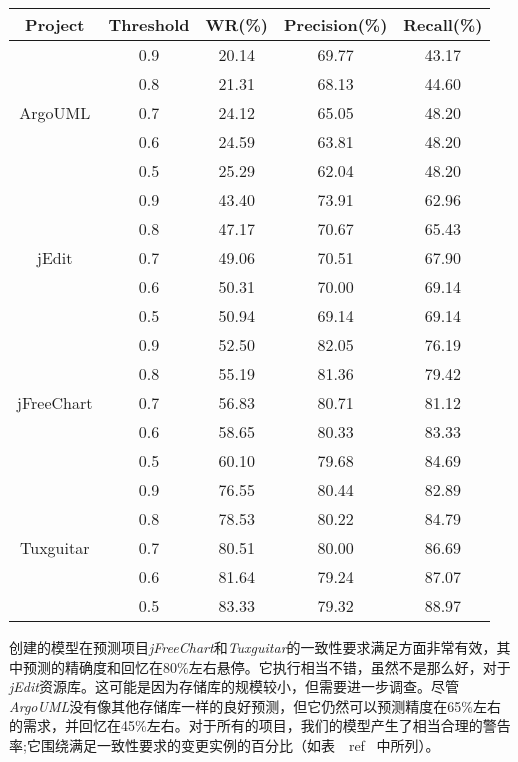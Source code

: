 \begin{table}[htbp]
\vspace{0.5em}\centering\wuhao
\begin{tabular}{ccccc}
\toprule[1.5pt]
\textbf{Project}&\textbf{Threshold}&\textbf{WR(\%)}&\textbf{Precision(\%)}&\textbf{Recall(\%)}\\

\midrule[1pt]
 \multirow{5}{*}{ArgoUML}
&0.9&	20.14&	69.77&	43.17\\
&0.8&	21.31&	68.13&	44.60\\
&0.7&	24.12&	65.05&	48.20\\
&0.6&	24.59&	63.81&	48.20\\
&0.5&	25.29&	62.04&	48.20\\
\hline
\multirow{5}{*}{jEdit}
&0.9&	43.40&	73.91&	62.96\\
&0.8&	47.17&	70.67&	65.43\\
&0.7&	49.06&	70.51&	67.90\\
&0.6&	50.31&	70.00&	69.14\\
&0.5&	50.94&	69.14&	69.14\\
\hline
\multirow{5}{*}{jFreeChart}
&0.9&	52.50&	82.05&	76.19\\
&0.8&	55.19&	81.36&	79.42\\
&0.7&	56.83&	80.71&	81.12\\
&0.6&	58.65&	80.33&	83.33\\
&0.5&	60.10&	79.68&	84.69\\
\hline
\multirow{5}{*}{Tuxguitar}
&0.9	&76.55&   80.44&	82.89\\
&0.8	&78.53&	80.22&	84.79\\
&0.7	&80.51&	80.00&	86.69\\
&0.6	&81.64&	79.24&	87.07\\
&0.5    &83.33&	79.32&	88.97\\
\bottomrule[1.5pt]
\end{tabular}
\end{table}

创建的模型在预测项目{\em jFreeChart}和{\em Tuxguitar}的一致性要求满足方面非常有效，其中预测的精确度和回忆在80\%左右悬停。它执行相当不错，虽然不是那么好，对于{\em jEdit}资源库。这可能是因为存储库的规模较小，但需要进一步调查。尽管{\em  ArgoUML}没有像其他存储库一样的良好预测，但它仍然可以预测精度在65\%左右的需求，并回忆在45\%左右。对于所有的项目，我们的模型产生了相当合理的警告率;它围绕满足一致性要求的变更实例的百分比（如表~\ ref {}~中所列）。

